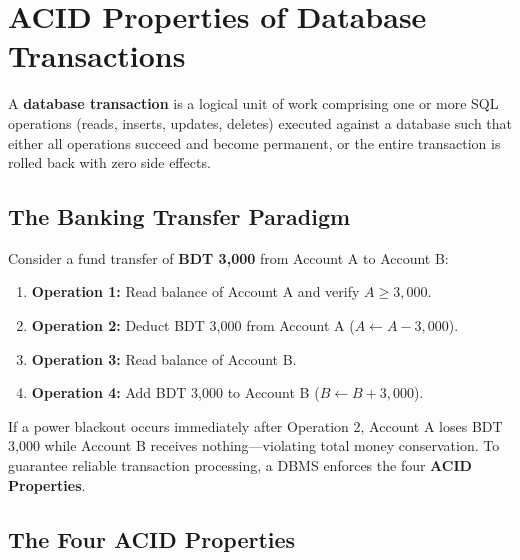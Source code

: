 \newpage
\section{ACID Properties of Database Transactions}

A \textbf{database transaction} is a logical unit of work comprising one or more SQL operations (reads, inserts, updates, deletes) executed against a database such that either all operations succeed and become permanent, or the entire transaction is rolled back with zero side effects.

\subsection{The Banking Transfer Paradigm}

Consider a fund transfer of \textbf{BDT 3,000} from Account A to Account B:
\begin{enumerate}
\item \textbf{Operation 1:} Read balance of Account A and verify $A \ge 3,000$.
\item \textbf{Operation 2:} Deduct BDT 3,000 from Account A ($A \leftarrow A - 3,000$).
\item \textbf{Operation 3:} Read balance of Account B.
\item \textbf{Operation 4:} Add BDT 3,000 to Account B ($B \leftarrow B + 3,000$).
\end{enumerate}
If a power blackout occurs immediately after Operation 2, Account A loses BDT 3,000 while Account B receives nothing—violating total money conservation. To guarantee reliable transaction processing, a DBMS enforces the four \textbf{ACID Properties}.

\subsection{The Four ACID Properties}

